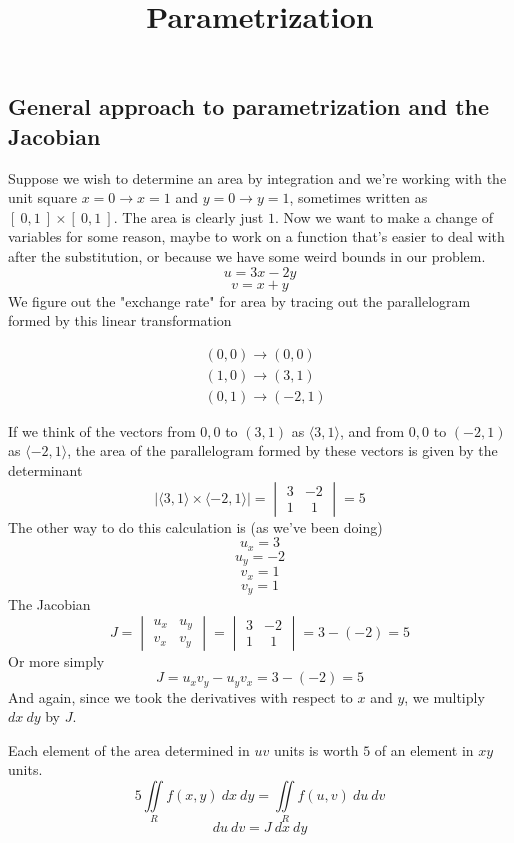 \documentclass[11pt, oneside]{article}
\title{Parametrization}
\date{}
\begin{document}
\maketitle
\Large

\subsection*{General approach to parametrization and the Jacobian}
Suppose we wish to determine an area by integration and we're working with the unit square $x=0 \to x=1$ and $y=0 \to y=1$, sometimes written as $[\ 0,1\ ] \times [\ 0,1\ ]$.  The area is clearly just $1$.  Now we want to make a change of variables for some reason, maybe to work on a function that's easier to deal with after the substitution, or because we have some weird bounds in our problem.
\[ u = 3x-2y \]
\[ v = x + y \]
We figure out the "exchange rate" for area by tracing out the parallelogram formed by this linear transformation

\begin{align*}
& (0,0) \to (0,0) \\
& (1,0) \to (3,1) \\
& (0,1) \to (-2,1)
\end{align*}

If we think of the vectors from $0,0$ to $(3,1)$ as $\langle 3, 1 \rangle$,  and from $0,0$ to $(-2,1)$ as $\langle -2 ,1 \rangle$, the area of the parallelogram formed by these vectors is given by the determinant
\[
| \langle 3, 1 \rangle \times \langle -2 ,1 \rangle | =
\begin{vmatrix}
3 & -2 \\
1 & \ \ 1 
\end{vmatrix} = 5
\]
The other way to do this calculation is (as we've been doing)
\[ u_x = 3 \]
\[ u_y = -2 \]
\[ v_x = 1 \]
\[ v_y = 1 \]
The Jacobian
\[ J = 
\begin{vmatrix}
u_x & u_y \\
v_x & v_y 
\end{vmatrix} = 
\begin{vmatrix}
3 & -2 \\
1 & \ \ 1 
\end{vmatrix}
= 3 - (-2) = 5 \]
Or more simply
\[ J = u_x v_y - u_y v_x = 3  - (-2) = 5 \]
And again, since we took the derivatives with respect to $x$ and $y$, we multiply $dx \ dy$ by $J$.

Each element of the area determined in $uv$ units is worth $5$ of an element in $xy$ units.
\[ 5 \iint\limits_{R}  f(x,y) \ dx \ dy = \iint\limits_{R}  f(u,v) \ du \ dv \]
\begin{equation}
\boxed{du \ dv = J \ dx \ dy }
\end{equation}
\end{document}
